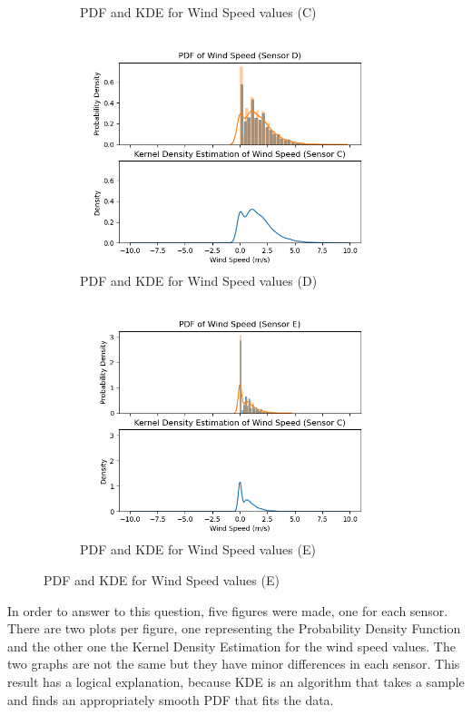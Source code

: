 \documentclass[a4paper,12pt]{article} %
\begin{document}
\begin{figure}[H]
\begin{subfigure}[b]{0.4\linewidth}
		\caption{PDF and KDE for Wind Speed values (C)}
	\end{subfigure}
	\begin{subfigure}[b]{0.4\linewidth}
		\includegraphics[width=0.9\linewidth]{Figure_13.png} 
		\caption{PDF and KDE for Wind Speed values (D)}
	\end{subfigure}
	\begin{subfigure}[b]{0.4\linewidth}
		\includegraphics[width=0.9\linewidth]{Figure_14.png} 
		\caption{PDF and KDE for Wind Speed values (E)}
	\end{subfigure}
\end{figure}

In order to answer to this question, five figures were made, one for each sensor. There are two plots per figure, one representing the Probability Density Function and the other one the Kernel Density Estimation for the wind speed values. The two graphs are not the same but they have minor differences in each sensor. This result has a logical explanation, because  KDE is an algorithm that takes a sample and finds an appropriately smooth PDF that fits the data. 
\end{document}
